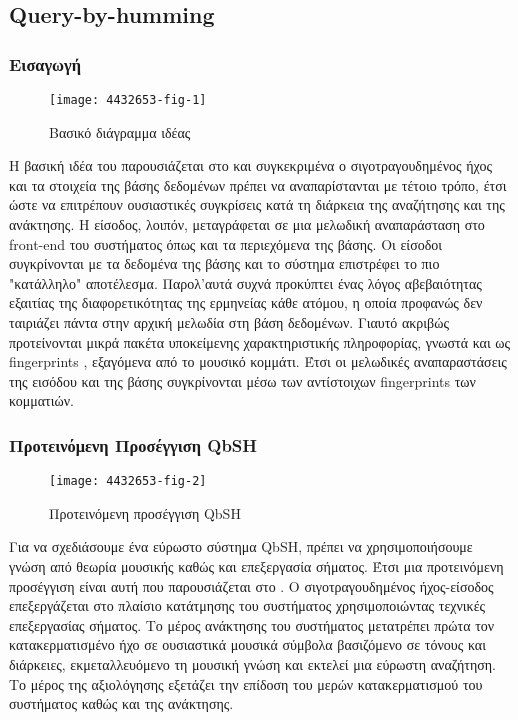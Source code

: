 \newcommand*{\qbh}{Query-by-humming}%
\newcommand*{\fp}{Fingerprinting}%
\newcommand*{\fps}{fingerprints }%
\subsection{\qbh{}}\label{sub:qbh}

\subsubsection{Εισαγωγή}
\begin{wrapfigure}{r}{0.5\textwidth}
        \centering
        \vspace{-20pt}\texttt{[image: 4432653-fig-1]}
        \vspace{-20pt}\caption{Βασικό διάγραμμα ιδέας}
        \label{fig:4432653-fig-1}
\end{wrapfigure} 
Η βασική ιδέα του \cite{fingerapproach2008} παρουσιάζεται στο  και συγκεκριμένα ο σιγοτραγουδημένος ήχος και τα στοιχεία της βάσης δεδομένων πρέπει να αναπαρίστανται με τέτοιο τρόπο, έτσι ώστε να επιτρέπουν ουσιαστικές συγκρίσεις κατά τη διάρκεια της αναζήτησης και της ανάκτησης. Η είσοδος, λοιπόν, μεταγράφεται σε μια μελωδική αναπαράσταση στο front-end του συστήματος όπως και τα περιεχόμενα της βάσης. Οι είσοδοι συγκρίνονται με τα δεδομένα της βάσης και το σύστημα επιστρέφει το πιο "κατάλληλο" αποτέλεσμα. Παρολ'αυτά συχνά προκύπτει ένας λόγος αβεβαιότητας εξαιτίας της διαφορετικότητας της ερμηνείας κάθε ατόμου, η οποία προφανώς δεν ταιριάζει πάντα στην αρχική μελωδία στη βάση δεδομένων. Γιαυτό ακριβώς προτείνονται μικρά πακέτα υποκείμενης χαρακτηριστικής πληροφορίας, γνωστά και ως \fps, εξαγόμενα από το μουσικό κομμάτι. Έτσι οι μελωδικές αναπαραστάσεις της εισόδου και της βάσης συγκρίνονται μέσω των αντίστοιχων \fps των κομματιών.

\subsubsection{Προτεινόμενη Προσέγγιση QbSH}
\begin{wrapfigure}{r}{0.5\textwidth}
        \centering
        \vspace{-20pt}\texttt{[image: 4432653-fig-2]}
        \vspace{-20pt}\caption{Προτεινόμενη προσέγγιση QbSH}
        \label{fig:4432653-fig-2}
\end{wrapfigure}
Για να σχεδιάσουμε ένα εύρωστο σύστημα QbSH, πρέπει να χρησιμοποιήσουμε γνώση από θεωρία μουσικής καθώς και επεξεργασία σήματος. Έτσι μια προτεινόμενη προσέγγιση είναι αυτή που παρουσιάζεται στο . Ο σιγοτραγουδημένος ήχος-είσοδος επεξεργάζεται στο πλαίσιο κατάτμησης του συστήματος χρησιμοποιώντας τεχνικές επεξεργασίας σήματος. Το μέρος ανάκτησης του συστήματος μετατρέπει πρώτα τον κατακερματισμένο ήχο σε ουσιαστικά μουσικά σύμβολα βασιζόμενο σε τόνους και διάρκειες, εκμεταλλευόμενο τη μουσική γνώση και εκτελεί μια εύρωστη αναζήτηση. Το μέρος της αξιολόγησης εξετάζει την επίδοση του μερών κατακερματισμού του συστήματος καθώς και της ανάκτησης.

